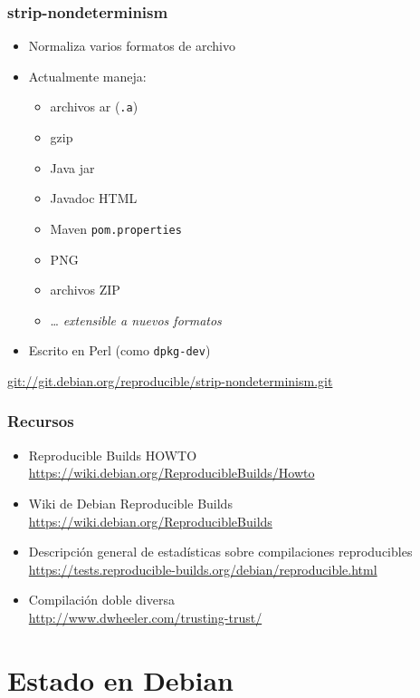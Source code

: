 \documentclass[14pt,aspectratio=169]{beamer}
\begin{document}
\begin{frame}
 \frametitle{strip-nondeterminism}

 \begin{itemize}
  \item Normaliza varios formatos de archivo
  \item Actualmente maneja:
   \begin{itemize}
    \item archivos ar (\texttt{.a})
    \item gzip
    \item Java jar
    \item Javadoc HTML
    \item Maven \texttt{pom.properties}
    \item PNG
    \item archivos ZIP
    \item … \textit{extensible a nuevos formatos}
   \end{itemize}
  \item Escrito en Perl (como \texttt{dpkg-dev})
 \end{itemize}
 \vfill
 \begin{center}\small
  \url{git://git.debian.org/reproducible/strip-nondeterminism.git}
 \end{center}
\end{frame}

\begin{frame}
 \frametitle{Recursos}

 \begin{itemize}
  \item Reproducible Builds HOWTO \\
   \url{https://wiki.debian.org/ReproducibleBuilds/Howto}
  \item<2-> Wiki de Debian Reproducible Builds \\
   \url{https://wiki.debian.org/ReproducibleBuilds}
   \item<2-> Descripción general de estadísticas sobre compilaciones reproducibles \\
   \url{https://tests.reproducible-builds.org/debian/reproducible.html}
  \item<3> Compilación doble diversa \\
   \url{http://www.dwheeler.com/trusting-trust/}
 \end{itemize}
\end{frame}

\section{Estado en Debian}
\end{document}
